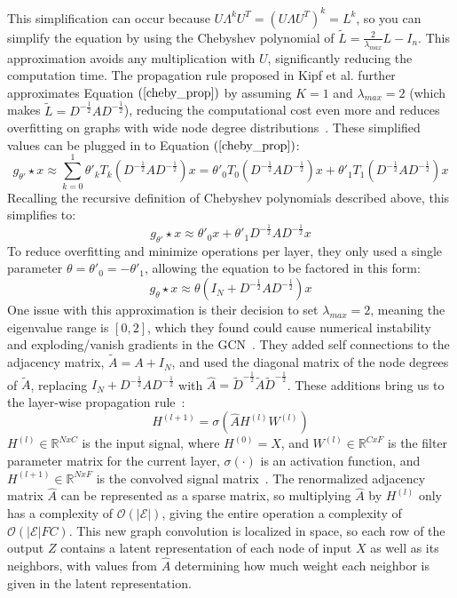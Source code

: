 This simplification can occur because $U \Lambda^k U^T = (U \Lambda U^T)^k = L^k $, so you can simplify the equation by using the Chebyshev polynomial of $\tilde{L} = \frac{2}{\lambda_{max}} L - I_n$. This approximation avoids any multiplication with $U$, significantly reducing the computation time. The propagation rule proposed in Kipf et al. further approximates Equation $(\ref{cheby_prop})$ by assuming $K = 1$ and $\lambda_{max} = 2$ (which makes $\tilde{L} = D^{-\frac{1}{2}}AD^{-\frac{1}{2}}$), reducing the computational cost even more and reduces overfitting on graphs with wide node degree distributions~\cite{Kipf2016}. These simplified values can be plugged in to Equation $(\ref{cheby_prop})$:
\begin{equation}
\label{reduce_k}
g_{\theta'} \star x \approx \sum\limits_{k=0}^{1} \theta'_k T_k (D^{-\frac{1}{2}}AD^{-\frac{1}{2}})x = \theta'_0 T_0(D^{-\frac{1}{2}}AD^{-\frac{1}{2}})x + \theta'_1 T_1(D^{-\frac{1}{2}}AD^{-\frac{1}{2}})x 
\end{equation}
Recalling the recursive definition of Chebyshev polynomials described above, this simplifies to:
\begin{equation}
\label{simplified_1stcheby}
g_{\theta'} \star x \approx \theta'_0x + \theta'_1 D^{-\frac{1}{2}}AD^{-\frac{1}{2}}x 
\end{equation}
To reduce overfitting and minimize operations per layer, they only used a single parameter $\theta = \theta'_0 = -\theta'_1$, allowing the equation to be factored in this form:
\begin{equation}
\label{single_param}
g_\theta \star x \approx \theta(I_N + D^{-\frac{1}{2}}AD^{-\frac{1}{2}})x
\end{equation}
One issue with this approximation is their decision to set $\lambda_{max} = 2$, meaning the eigenvalue range is $[0,2]$, which they found could cause numerical instability and exploding/vanish gradients in the GCN~\cite{Kipf2016}. They added self connections to the adjacency matrix, $\tilde{A} = A + I_N$, and used the diagonal matrix of the node degrees of $\tilde{A}$, replacing $I_N + D^{-\frac{1}{2}}AD^{-\frac{1}{2}}$ with $\hat{A} = \tilde{D}^{-\frac{1}{2}}\tilde{A}\tilde{D}^{-\frac{1}{2}}$. These additions bring us to the layer-wise propagation rule~\cite{Kipf2016}:
\begin{equation}
\label{prop_rule}
H^{(l+1)} = \sigma(\hat{A}H^{(l)}W^{(l)})
\end{equation}
$H^{(l)} \in \mathbb{R}^{N x C}$ is the input signal, where $H^{(0)} = X$, and $W^{(l)} \in \mathbb{R}^{C x F}$ is the filter parameter matrix for the current layer, $\sigma(\cdot)$ is an activation function, and $H^{(l+1)} \in \mathbb{R}^{N x F}$ is the convolved signal matrix~\cite{Kipf2016}. The renormalized adjacency matrix $\hat{A}$ can be represented as a sparse matrix, so multiplying $\hat{A}$ by $H^{(l)}$ only has a complexity of $\mathcal{O}(|\mathcal{E}|)$, giving the entire operation a complexity of $\mathcal{O}(|\mathcal{E}|FC)$.  This new graph convolution is localized in space, so each row of the output $Z$ contains a latent representation of each node of input $X$ as well as its neighbors, with values from $\hat{A}$ determining how much weight each neighbor is given in the latent representation.

